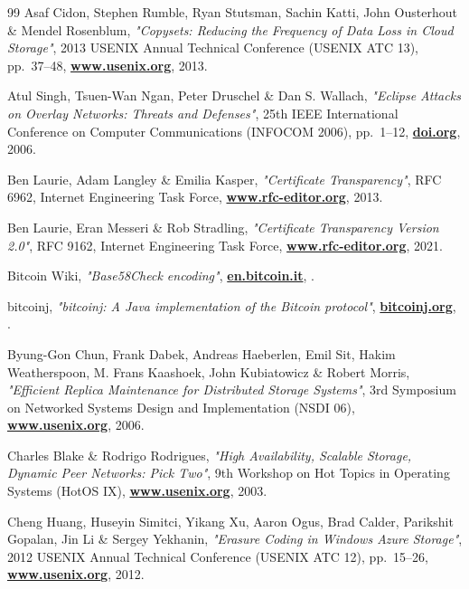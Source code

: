 \documentclass[10pt,a4paper,final]{article}
\let\oldhref\href
\renewcommand{\href}[2]{\oldhref{#1}{\bfseries#2}}
\begin{document}
\begin{thebibliography}{99}
	Asaf Cidon, Stephen Rumble, Ryan Stutsman, Sachin Katti, John Ousterhout \& Mendel Rosenblum,
	\emph{"Copysets: Reducing the Frequency of Data Loss in Cloud Storage"},
	2013 USENIX Annual Technical Conference (USENIX ATC 13), pp.~37--48,
	\href{https://www.usenix.org/conference/atc13/technical-sessions/presentation/cidon}{www.usenix.org},
	2013.

	Atul Singh, Tsuen-Wan Ngan, Peter Druschel \& Dan S. Wallach,
	\emph{"Eclipse Attacks on Overlay Networks: Threats and Defenses"},
	25th IEEE International Conference on Computer Communications (INFOCOM 2006), pp.~1--12,
	\href{https://doi.org/10.1109/INFOCOM.2006.231}{doi.org},
	2006.

	Ben Laurie, Adam Langley \& Emilia Kasper,
	\emph{"Certificate Transparency"},
	RFC 6962, Internet Engineering Task Force,
	\href{https://www.rfc-editor.org/rfc/rfc6962}{www.rfc-editor.org},
	2013.

	Ben Laurie, Eran Messeri \& Rob Stradling,
	\emph{"Certificate Transparency Version 2.0"},
	RFC 9162, Internet Engineering Task Force,
	\href{https://www.rfc-editor.org/rfc/rfc9162}{www.rfc-editor.org},
	2021.

	Bitcoin Wiki,
	\emph{"Base58Check encoding"},
	\href{https://en.bitcoin.it/wiki/Base58Check_encoding}{en.bitcoin.it},
	\the\year{}.

	bitcoinj,
	\emph{"bitcoinj: A Java implementation of the Bitcoin protocol"},
	\href{https://bitcoinj.org/}{bitcoinj.org},
	\the\year{}.

	Byung-Gon Chun, Frank Dabek, Andreas Haeberlen, Emil Sit, Hakim Weatherspoon, M. Frans Kaashoek, John Kubiatowicz \& Robert Morris,
	\emph{"Efficient Replica Maintenance for Distributed Storage Systems"},
	3rd Symposium on Networked Systems Design and Implementation (NSDI 06),
	\href{https://www.usenix.org/conference/nsdi-06/efficient-replica-maintenance-distributed-storage-systems}{www.usenix.org},
	2006.

	Charles Blake \& Rodrigo Rodrigues,
	\emph{"High Availability, Scalable Storage, Dynamic Peer Networks: Pick Two"},
	9th Workshop on Hot Topics in Operating Systems (HotOS IX),
	\href{https://www.usenix.org/conference/hotos-ix/high-availability-scalable-storage-dynamic-peer-networks-pick-two}{www.usenix.org},
	2003.

	Cheng Huang, Huseyin Simitci, Yikang Xu, Aaron Ogus, Brad Calder, Parikshit Gopalan, Jin Li \& Sergey Yekhanin,
	\emph{"Erasure Coding in Windows Azure Storage"},
	2012 USENIX Annual Technical Conference (USENIX ATC 12), pp.~15--26,
	\href{https://www.usenix.org/conference/atc12/technical-sessions/presentation/huang}{www.usenix.org},
	2012.


\end{thebibliography}
\end{document}
